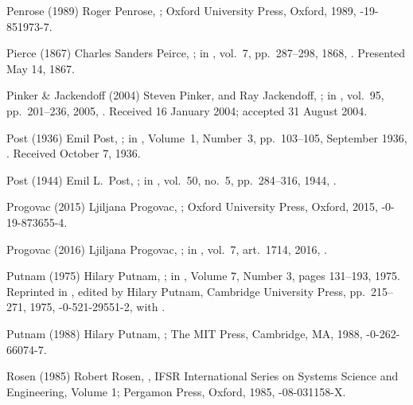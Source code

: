 \biblabel Penrose (1989)
Roger Penrose, \negthinspace
{};
Oxford University Press, Oxford, 1989,
-19-851973-7.

\biblabel Pierce (1867)
Charles Sanders Peirce,
;
in ,
vol.\ 7, pp.\ 287--298, 1868,
.
Presented May 14, 1867.

\biblabel Pinker \& Jackendoff (2004)
Steven Pinker, and Ray Jackendoff,
;
in ,
vol.\ 95, pp.\ 201--236, 2005,
.
Received 16 January 2004; accepted 31 August 2004.

\biblabel Post (1936)
Emil Post,
;
in ,
Volume\ 1, Number\ 3, pp.~103--105, September 1936,
.
Received October 7, 1936.

\biblabel Post (1944)
Emil L.\ Post,
;
in ,
vol.\ 50, no.~5, pp.\ 284--316, 1944,
.

\biblabel Progovac (2015)
Ljiljana Progovac,
;
Oxford University Press, Oxford, 2015,
-0-19-873655-4.

\biblabel Progovac (2016)
Ljiljana Progovac,
;
in ,
vol.\ 7, art.\ 1714, 2016,
.

\biblabel Putnam (1975)
Hilary Putnam,
;
in ,
Volume 7, Number 3, pages 131--193, 1975.
Reprinted in
,
edited by Hilary Putnam,
Cambridge University Press, pp.\ 215--271, 1975,
-0-521-29551-2, with
.

\biblabel Putnam (1988)
Hilary Putnam,
;
The MIT Press, Cambridge, MA, 1988,
-0-262-66074-7.

\biblabel Rosen (1985)
Robert Rosen,
,
 IFSR International Series on
 Systems Science and Engineering, Volume 1;
 Pergamon Press, Oxford, 1985,
-08-031158-X.

